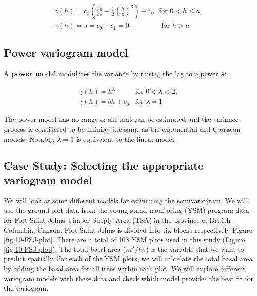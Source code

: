 \documentclass[
]{book}
\begin{document}
\[
\begin{array}{ccc}
\gamma{(h)} = c_1(\frac{3}{2}\frac{h}{a}-\frac{1}{2}(\frac{h}{a})^3)+c_0 & \text{for }0<h≤a, \\
\gamma{(h)} = s = c_0 + c_1 = 0 & \text{ for }h>a
\end{array}
\]

\hypertarget{power-variogram-model}{%
\subsection{Power variogram model}\label{power-variogram-model}}

A \textbf{power model} modulates the variance by raising the lag to a power \(λ\):

\[
\begin{array}{ccc}
\gamma{(h)} = h^λ & \text{for }0<λ<2, \\
\gamma{(h)} = bh+c_0 & \text{for }λ=1
\end{array}
\]

The power model has no range or sill that can be estimated and the variance process is considered to be infinite, the same as the exponential and Gaussian models. Notably, \(λ=1\) is equivalent to the linear model.

\hypertarget{case-study-selecting-the-appropriate-variogram-model}{%
\subsection*{Case Study: Selecting the appropriate variogram model}\label{case-study-selecting-the-appropriate-variogram-model}}

We will look at some different models for estimating the semivariogram. We will use the ground plot data from the young stand monitoring (YSM) program data \citep{province_of_bc_provincial_2018} for Fort Saint Johns Timber Supply Area (TSA) in the province of British Columbia, Canada. Fort Saint Johns is divided into six blocks respectively Figure \ref{fig:10-FSJ-plot}. There are a total of 108 YSM plots used in this study (Figure \ref{fig:10-FSJ-plot}). The total basal area (\(m^2/ha\)) is the variable that we want to predict spatially. For each of the YSM plots, we will calculate the total basal area by adding the basal area for all trees within each plot. We will explore different variogram models with these data and check which model provides the best fit for the variogram.
\end{document}
